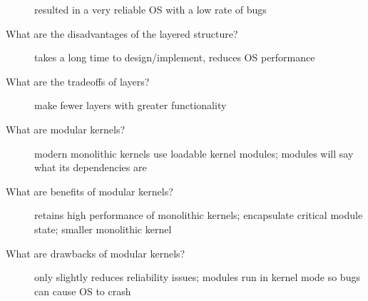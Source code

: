 \documentclass[10pt]{article}
\begin{document}
\begin{description}
  resulted in a very reliable OS with a low rate of bugs
\item[What are the disadvantages of the layered structure?]
  takes a long time to design/implement, reduces OS performance
\item[What are the tradeoffs of layers?]
  make fewer layers with greater functionality
\item[What are modular kernels?]
  modern monolithic kernels use loadable kernel modules; modules will say what its dependencies are
\item[What are benefits of modular kernels?]
  retains high performance of monolithic kernels;
  encapsulate critical module state;
  smaller monolithic kernel
\item[What are drawbacks of modular kernels?]
  only slightly reduces reliability issues;
  modules run in kernel mode so bugs can cause OS to crash
\end{description}
\end{document}
